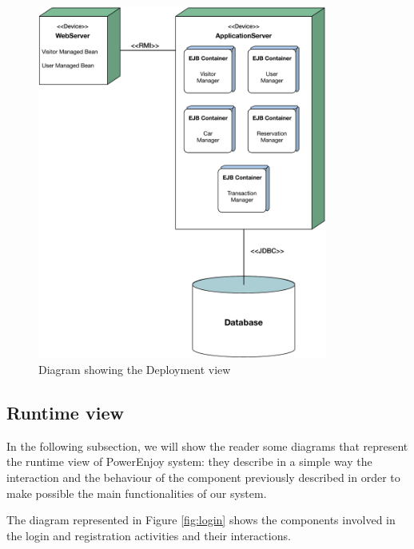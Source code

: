 \begin{figure}[htbp]
\centering
\vspace{12pt}
\includegraphics[width=0.85\textwidth]{Images/Deployment.pdf}
\vspace{10pt}
\caption{Diagram showing the Deployment view}
\label{fig:deployment}
\end{figure}
\clearpage

\subsection{Runtime view} \label{run-view}

In the following subsection, we will show the reader some diagrams that  represent the runtime view of PowerEnjoy system: they describe in a simple way the interaction and the behaviour of the component previously described in order to make possible the main functionalities of our system.

\newline
The diagram represented in Figure \ref{fig:login} shows the components involved in the login and registration activities and their interactions.

